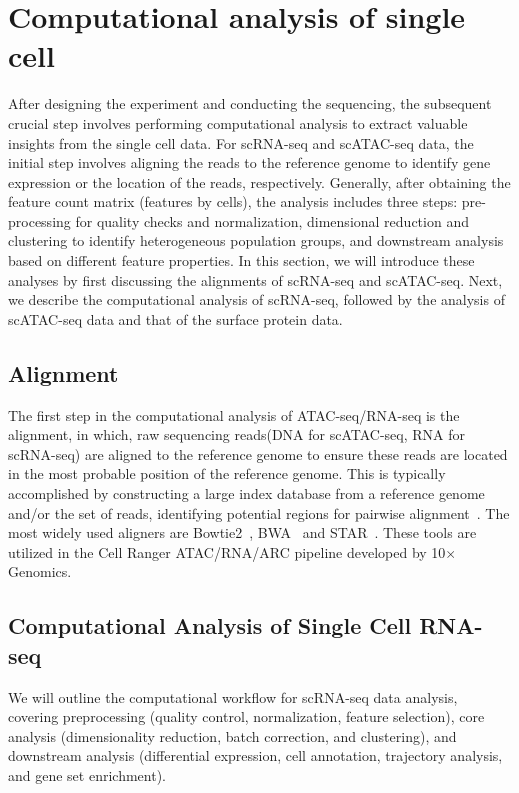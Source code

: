 \section{Computational analysis of single cell}
\label{background:computational_singlecell}
After designing the experiment and conducting the sequencing, the subsequent crucial step involves performing computational analysis to extract valuable insights from the single cell data. For scRNA-seq and scATAC-seq data, the initial step involves aligning the reads to the reference genome to identify gene expression or the location of the reads, respectively. Generally, after obtaining the feature count matrix (features by cells), the analysis includes three steps: pre-processing for quality checks and normalization, dimensional reduction and clustering to identify heterogeneous population groups, and downstream analysis based on different feature properties. In this section, we will introduce these analyses by first discussing the alignments of scRNA-seq and scATAC-seq. Next, we describe the computational analysis of scRNA-seq, followed by the analysis of scATAC-seq data and that of the surface protein data.

\subsection{Alignment}
\label{background:sec2:alignment}
The first step in the computational analysis of ATAC-seq/RNA-seq is the alignment, in which, raw sequencing reads(DNA for scATAC-seq, RNA for scRNA-seq) are aligned to the reference genome to ensure these reads are located in the most probable position of the reference genome. This is typically accomplished by constructing a large index database from a reference genome and/or the set of reads, identifying potential regions for pairwise alignment~\citep{alser2021alignment}. The most widely used aligners are Bowtie2~\citep{langmead2012bowtie2}, BWA~\citep{li2009BWA} and STAR~\citep{dobin2013star}. These tools are utilized in the Cell Ranger ATAC/RNA/ARC pipeline developed by 10$\times$ Genomics.

\subsection{Computational Analysis of Single Cell RNA-seq}
\label{background:sec2:scRNA}
We will outline the computational workflow for scRNA-seq data analysis, covering preprocessing (quality control, normalization, feature selection), core analysis (dimensionality reduction, batch correction, and clustering), and downstream analysis (differential expression, cell annotation, trajectory analysis, and gene set enrichment).

